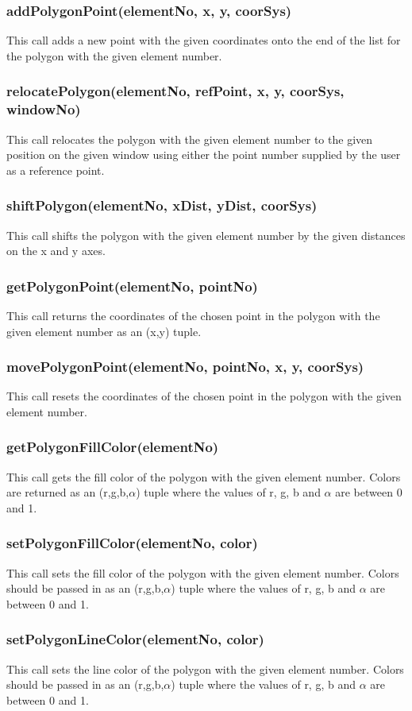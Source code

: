 \documentclass{acm_proc_article-sp}
\begin{document}
\subsubsection{addPolygonPoint(elementNo, x, y, coorSys)}
This call adds a new point with the given coordinates onto the end of the list for the polygon with the given element number.
\subsubsection{relocatePolygon(elementNo, refPoint, x, y, coorSys, windowNo)}
This call relocates the polygon with the given element number to the given position on the given window using either the point number supplied by the user as a reference point.
\subsubsection{shiftPolygon(elementNo, xDist, yDist, coorSys)}
This call shifts the polygon with the given element number by the given distances on the x and y axes.
\subsubsection{getPolygonPoint(elementNo, pointNo)}
This call returns the coordinates of the chosen point in the polygon with the given element number as an (x,y) tuple.
\subsubsection{movePolygonPoint(elementNo, pointNo, x, y, coorSys)}
This call resets the coordinates of the chosen point in the polygon with the given element number.
\subsubsection{getPolygonFillColor(elementNo)}
This call gets the fill color of the polygon with the given element number. Colors are returned as an (r,g,b,$\alpha$) tuple where the values of r, g, b and $\alpha$ are between 0 and 1.
\subsubsection{setPolygonFillColor(elementNo, color)}
This call sets the fill color of the polygon with the given element number. Colors should be passed in as an (r,g,b,$\alpha$) tuple where the values of r, g, b and $\alpha$ are between 0 and 1.
\subsubsection{setPolygonLineColor(elementNo, color)}
This call sets the line color of the polygon with the given element number. Colors should be passed in as an (r,g,b,$\alpha$) tuple where the values of r, g, b and $\alpha$ are between 0 and 1.
\end{document}
